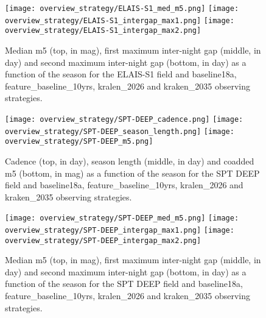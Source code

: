 \begin{figure}[htbp]
\begin{center}
  
  \texttt{[image: overview\_strategy/ELAIS-S1\_med\_m5.png]}
  \texttt{[image: overview\_strategy/ELAIS-S1\_intergap\_max1.png]}
    \texttt{[image: overview\_strategy/ELAIS-S1\_intergap\_max2.png]}
 \caption{Median m5 (top, in mag), first maximum inter-night gap (middle, in day) and second maximum inter-night gap (bottom, in day)  as a function of the season for the ELAIS-S1 field and baseline18a, feature\_baseline\_10yrs, kralen\_2026 and kraken\_2035 observing strategies.}\label{fig:elais-s1_m5}
\end{center}
\end{figure}




\begin{figure}[htbp]
\begin{center}
  \texttt{[image: overview\_strategy/SPT-DEEP\_cadence.png]}
  \texttt{[image: overview\_strategy/SPT-DEEP\_season\_length.png]}
  \texttt{[image: overview\_strategy/SPT-DEEP\_m5.png]}
 \caption{Cadence (top, in day), season length (middle, in day) and coadded m5 (bottom, in mag) as a function of the season for the SPT DEEP field and baseline18a, feature\_baseline\_10yrs, kralen\_2026 and kraken\_2035 observing strategies.}\label{fig:spt deep_cad}
\end{center}
\end{figure}

\begin{figure}[htbp]
\begin{center}
  
  \texttt{[image: overview\_strategy/SPT-DEEP\_med\_m5.png]}
  \texttt{[image: overview\_strategy/SPT-DEEP\_intergap\_max1.png]}
    \texttt{[image: overview\_strategy/SPT-DEEP\_intergap\_max2.png]}
 \caption{Median m5 (top, in mag), first maximum inter-night gap (middle, in day) and second maximum inter-night gap (bottom, in day)  as a function of the season for the SPT DEEP field and baseline18a, feature\_baseline\_10yrs, kralen\_2026 and kraken\_2035 observing strategies.}\label{fig:spt deep_m5}
\end{center}
\end{figure}




